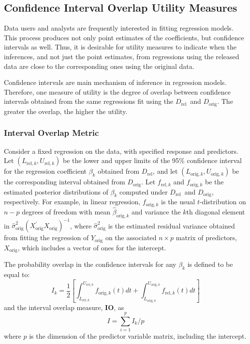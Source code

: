 \documentclass[12pt]{article}
\def\DBORIG{\ensuremath{{D}_{\mathrm{orig}}}} %
\def\DBREL{\ensuremath{D_{\mathrm{rel}}}} %
\def\IO{\ensuremath{\mathbf{IO}}} %
\begin{document}
\subsection{Confidence Interval Overlap Utility Measures}\label{subsec.ci}

Data users and analysts  are frequently interested in fitting regression models. 
This process produces not only point estimates of the coefficients, but
confidence intervals as well. Thus, it is desirable for utility measures 
to indicate when the inferences, and
not just the point estimates, from regressions using the released
data are close to the corresponding ones using the original data.

Confidence intervals are main mechanism of inference in regression
models. Therefore, one measure of utility is the degree of overlap
between confidence intervals obtained from the same regressions
fit using the \DBREL\ and \DBORIG. The greater the overlap, the
higher the utility.

\subsubsection{Interval Overlap Metric}
Consider a fixed regression on the data, with specified response
and predictors. Let $(L_{\mathrm{rel},k}, U_{\mathrm{rel},k})$ be
the lower and upper limits of the 95\% confidence interval for the
regression coefficient $\beta_{k}$ obtained from \DBREL, and let
$(L_{\mathrm{orig},k}, U_{\mathrm{orig},k})$ be the corresponding
interval obtained from \DBORIG. Let $f_{\mathrm{rel},k}$ and
$f_{\mathrm{orig},k}$ be the estimated posterior distributions of
$\beta_k$ computed under \DBREL\ and \DBORIG, respectively.  For
example, in linear regression, $f_{\mathrm{orig},k}$ is the usual
$t$-distribution on $n-p$ degrees of freedom with mean
$\hat{\beta}_{\mathrm{orig},k}$ and variance the $k$th diagonal
element in
$\hat{\sigma}^2_{\mathrm{orig}}\left(X^{'}_{\mathrm{orig}}
X_{\mathrm{orig}}\right)^{-1}$, where
$\hat{\sigma}^2_{\mathrm{orig}}$ is the estimated residual
variance obtained from fitting the regression of
$Y_{\mathrm{orig}}$ on the associated $n \times p$ matrix of
predictors, $X_{\mathrm{orig}}$, which includes a vector of ones
for the intercept.

The probability overlap in the confidence intervals for
any $\beta_{k}$ \citep{kkors06} is defined to be equal to:
\begin{equation}
I_k = \frac{1}{2}
\left[\int_{L_{\mathrm{rel},k}}^{U_{\mathrm{rel},k}}
f_{\mathrm{orig},k}(t) dt +
\int_{L_{\mathrm{orig},k}}^{U_{\mathrm{orig},k}}
f_{\mathrm{rel},k}(t) dt \right]
\end{equation}
and the interval overlap measure, \IO, as
\begin{equation}
I = \sum_{i=1}^p I_k / p
\end{equation}
where $p$ is the dimension of the predictor variable matrix, including
the intercept.
\end{document}
